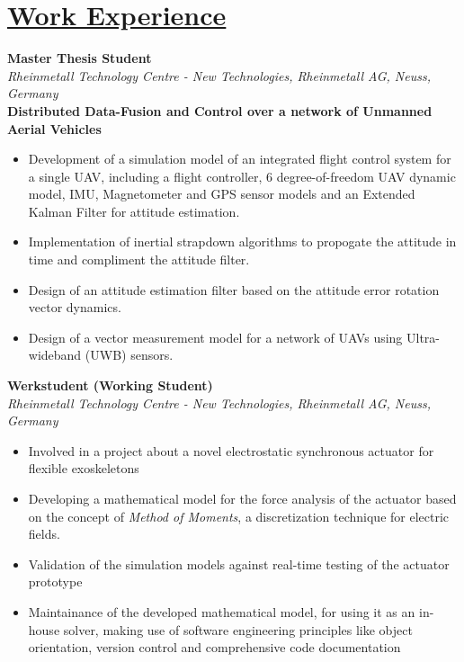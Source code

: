 
\section{\underline{Work Experience}}

\large{\textbf{Master Thesis Student}}
\hfill
\masterarbeitdate\\
\large{\emph{Rheinmetall Technology Centre - New Technologies, Rheinmetall AG, Neuss, Germany}}\\
\large{\textbf{Distributed Data-Fusion and Control over a network of Unmanned Aerial Vehicles}}\\
\masterarbeitBetreuer
\begin{itemize}
    \item Development of a simulation model of an integrated flight control system for a single UAV, including a flight controller, 6 degree-of-freedom UAV dynamic model, IMU, Magnetometer and GPS sensor models and an Extended Kalman Filter for attitude estimation.
    \item Implementation of inertial strapdown algorithms to propogate the attitude in time and compliment the attitude filter.
    \item Design of an attitude estimation filter based on the attitude error rotation vector dynamics.
    \item Design of a vector measurement model for a network of UAVs using Ultra-wideband (UWB) sensors.
\end{itemize}

\large{\textbf{Werkstudent (Working Student)}}
\hfill
\rheinmetalldate\\
\large{\emph{Rheinmetall Technology Centre - New Technologies, Rheinmetall AG, Neuss, Germany}}
\begin{itemize}
\item\large{Involved in a project about a novel electrostatic synchronous actuator for flexible exoskeletons}
\item\large{Developing a mathematical model for the force analysis of the actuator based on the concept of \emph{Method of Moments}, a discretization technique for electric fields.}
\item\large{Validation of the simulation models against real-time testing of the actuator prototype}
\item\large{Maintainance of the developed mathematical model, for using it as an in-house solver, making use of software engineering principles like object orientation, version control and comprehensive code documentation}
\end{itemize}

